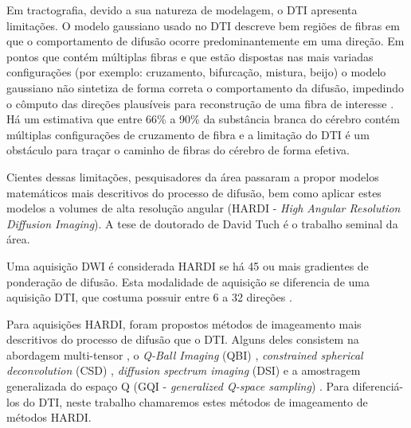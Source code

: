 \documentclass[
    12pt,                %
    oneside,            %
    a4paper,            %
    english,            %
    french,                %
    spanish,            %
    brazil                %
    ]{abntex2}
\begin{document}

Em tractografia, devido a sua natureza de modelagem, o DTI apresenta limitações. O modelo gaussiano usado no DTI descreve bem regiões de fibras em que o comportamento de difusão ocorre predominantemente em uma direção. Em pontos que contém múltiplas fibras e que estão dispostas nas mais variadas configurações (por exemplo: cruzamento, bifurcação, mistura, beijo) o modelo gaussiano não sintetiza de forma correta o comportamento da difusão, impedindo o cômputo das direções plausíveis para reconstrução de uma fibra de interesse \cite{fillard2011, daducci2014}. Há um estimativa que entre 66\% a 90\% da substância branca do cérebro contém múltiplas configurações de cruzamento de fibra \cite{descoteaux2015} e a limitação do DTI é um obstáculo para traçar o caminho de fibras do cérebro de forma efetiva.



Cientes dessas limitações, pesquisadores da área passaram a propor modelos matemáticos mais descritivos do processo de difusão, bem como aplicar estes modelos a volumes de alta resolução angular  (HARDI - \textit{High Angular Resolution Diffusion Imaging}). A tese de doutorado de David Tuch \cite{tuch2002} é o trabalho seminal da área.

Uma aquisição DWI é considerada HARDI se há 45 ou mais gradientes de ponderação de difusão. Esta modalidade de aquisição se diferencia de uma aquisição DTI, que costuma possuir entre 6 a 32 direções \cite{descoteaux2015}.


Para aquisições HARDI, foram propostos métodos de imageamento mais descritivos do processo de difusão que o DTI. Alguns deles consistem na abordagem multi-tensor \cite{tuch2002}, o \textit{Q-Ball Imaging} (QBI) \cite{tuch2002, Kindlmann2004}, \textit{constrained spherical deconvolution} (CSD) \cite{tournier2007}, \textit{diffusion spectrum imaging} (DSI) \cite{tuch2002,wedeen2005} e a amostragem generalizada do espaço Q (GQI - \textit{generalized Q-space sampling}) \cite{yeh2010}. Para diferenciá-los do DTI, neste trabalho chamaremos estes métodos de imageamento de métodos HARDI.
\end{document}
